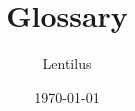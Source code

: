 \title{Glossary}
\author{Lentilus}
\date{\today}

\renewcommand*\contentsname{Index}
\setcounter{secnumdepth}{0}


\renewenvironment{zettel}[1]{%
	\begin{mdframed}[nobreak=true, topline=false,bottomline=false, rightline=false]
		\hypertarget{#1}{\section{#1}}
		}{%
	\end{mdframed}
}%
